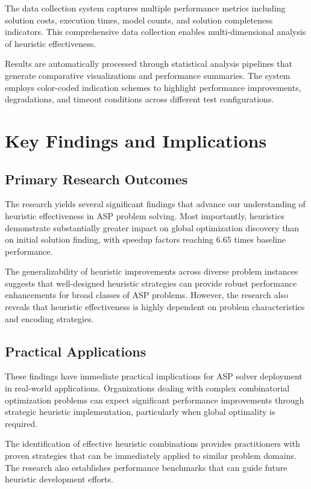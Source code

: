 \documentclass[11pt,a4paper]{article}
\begin{document}
The data collection system captures multiple performance metrics including solution costs, execution times, model counts, and solution completeness indicators. This comprehensive data collection enables multi-dimensional analysis of heuristic effectiveness.

Results are automatically processed through statistical analysis pipelines that generate comparative visualizations and performance summaries. The system employs color-coded indication schemes to highlight performance improvements, degradations, and timeout conditions across different test configurations.

\section{Key Findings and Implications}

\subsection{Primary Research Outcomes}

The research yields several significant findings that advance our understanding of heuristic effectiveness in ASP problem solving. Most importantly, heuristics demonstrate substantially greater impact on global optimization discovery than on initial solution finding, with speedup factors reaching 6.65 times baseline performance.

The generalizability of heuristic improvements across diverse problem instances suggests that well-designed heuristic strategies can provide robust performance enhancements for broad classes of ASP problems. However, the research also reveals that heuristic effectiveness is highly dependent on problem characteristics and encoding strategies.

\subsection{Practical Applications}

These findings have immediate practical implications for ASP solver deployment in real-world applications. Organizations dealing with complex combinatorial optimization problems can expect significant performance improvements through strategic heuristic implementation, particularly when global optimality is required.

The identification of effective heuristic combinations provides practitioners with proven strategies that can be immediately applied to similar problem domains. The research also establishes performance benchmarks that can guide future heuristic development efforts.
\end{document}
